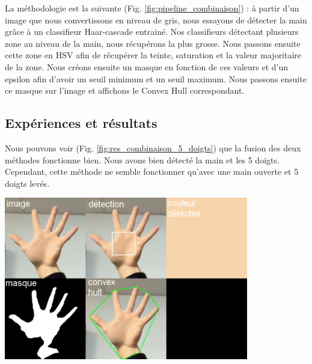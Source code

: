 \documentclass[11pt]{article}
\begin{document}
La méthodologie est la suivante (Fig. \ref{fig:pipeline_combinaison}) : à partir d'un image que nous convertissons en niveau de gris, nous essayons de détecter la main grâce à un classifieur Haar-cascade entrainé. Nos classifieurs détectant plusieurs zone au niveau de la main, nous récupérons la plus grosse. Nous passons ensuite cette zone en HSV afin de récupérer la teinte, saturation et la valeur majoritaire de la zone. Nous créons ensuite un masque en fonction de ces valeurs et d'un epsilon afin d'avoir un seuil minimum et un seuil maximum. Nous passons ensuite ce masque sur l'image et affichons le Convex Hull correspondant.
\newpage
\subsection{Expériences et résultats}

Nous pouvons voir (Fig. \ref{fig:res_combinaison_5_doigts}) que la fusion des deux méthodes fonctionne bien. Nous avons bien détecté la main et les 5 doigts.
Cependant, cette méthode ne semble fonctionner qu'avec une main ouverte et 5 doigts levés.
\begin{center}
    \includegraphics[width=0.8\textwidth]{images/res_combinaison_5_doigts.png}
    \label{fig:res_combinaison_5_doigts}
\end{center}
\bigbreak
\end{document}
